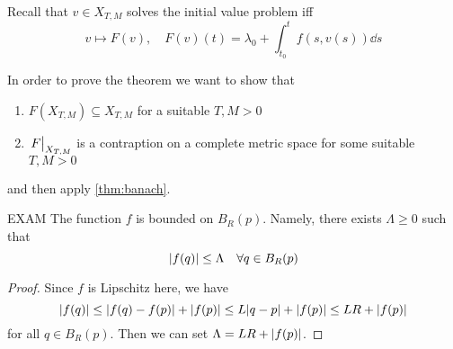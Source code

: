 \documentclass[12pt]{extarticle}
\begin{document}
Recall that $v \in X_{T, M}$ solves the initial value problem iff
\begin{equation}
	v \mapsto F(v), \quad F(v)(t) = \lambda_0 + \int^t_{t_0} f(s, v(s)) \dd s
\end{equation}

In order to prove the theorem we want to show that
\begin{enumerate}
	\item $F(X_{T, M}) \subseteq X_{T, M}$ for a suitable $T, M >0$
	\item $\eval{F}_{X_{T, M}}$ is a contraption on a complete metric space for some suitable $T, M > 0$
\end{enumerate}
and then apply \cref{thm:banach}.

\begin{proposition}{EXAM}{}
	The function $f$ is bounded on $B_R(p)$.
	Namely, there exists $\Lambda \geq 0$ such that
	\begin{equation}
		\abs{f(q)} \leq \Lambda \quad \forall q \in B_R(p)
	\end{equation}
\end{proposition}

\begin{proof}
	Since $f$ is Lipschitz here, we have
	\begin{equation}
		\abs{f(q)} \leq \abs{f(q)-f(p)} + \abs{f(p)} \leq L \abs{q-p} + \abs{f(p)} \leq L R + \abs{f(p)}
	\end{equation}
	for all $q \in B_R(p)$.
	Then we can set $\Lambda = LR + \abs{f(p)}$.
\end{proof}
\end{document}
